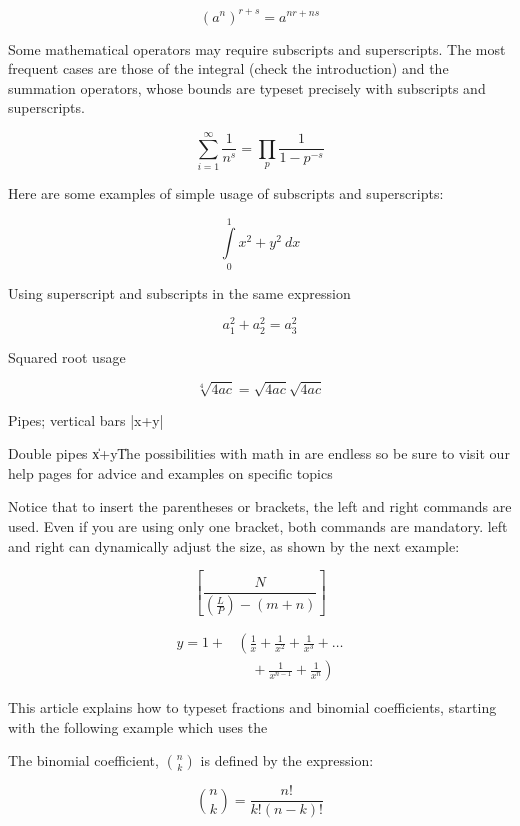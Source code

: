 \documentclass[12pt, letterpaper]{article}
\begin{document}
\[(a^n)^{r+s}=a^{nr+ns} \]


Some mathematical operators may require subscripts and superscripts. The most frequent cases are those of the integral (check the introduction) and the summation operators, whose bounds are typeset precisely with subscripts and superscripts.


\[\sum_{i=1}^{\infty} \frac{1}{n^s} =\prod_{p} \frac{1}{1-p^{-s}} \]

Here are some examples of simple usage of subscripts and superscripts:

\[ \int\limits_0^1 x^2 + y^2 \ dx \]


Using superscript and subscripts in the same expression

\[ a_1^2 + a_2^2 = a_3^2 \]

\vspace{1cm}

Squared root usage

\[ \sqrt[4]{4ac} = \sqrt{4ac}\sqrt{4ac} \]

Pipes; vertical bars	|x+y|

Double pipes \|x+y\|




The possibilities with math in \LaTex{} are endless so be sure to visit our help pages for advice and examples on specific topics

\bigskip

Notice that to insert the parentheses or brackets, the left and right commands are used. Even if you are using only one bracket, both commands are mandatory. left and right can dynamically adjust the size, as shown by the next example:

\[
\left[  \frac{N} { \left( \frac{L}{P}  \right) -\left( m+n \right ) }\right]
\]

\begin{align*}
y  = 1 + & \left(  \frac{1}{x} + \frac{1}{x^2} + \right. \frac{1}{x^3}  + \ldots  \\
  & \left. \quad  + \frac{1}{x^{n-1}} + \frac{1}{x^n} \right)
\end{align*}


\newpage
This article explains how to typeset fractions and binomial coefficients, starting with the following example which uses the


The binomial coefficient, \(\binom{n}{k}\)  is defined by the expression:

\[\binom{n}{k} = \frac{n!}{k!  \left(n-k \right)!}\]
\end{document}
